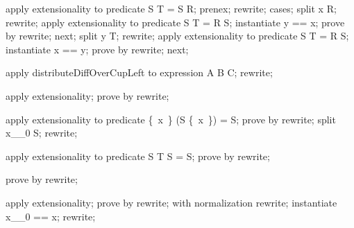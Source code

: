 \begin{LPScript}\begin{forget}[lCapEquivWeakensDiffEquiv]
apply extensionality to predicate S \setminus [X] T = S \setminus [X] R;
prenex;
rewrite;
cases;
split x \in  R;
rewrite;
apply extensionality to predicate S \cap [X] T = R \cap [X] S;
instantiate y == x;
prove by rewrite;
next;
split y \in  T;
rewrite;
apply extensionality to predicate S \cap [X] T = R \cap [X] S;
instantiate x == y;
prove by rewrite;
next;
\end{forget}\end{LPScript}

\begin{LPScript}\begin{forget}[lDistDiffOverUnionLeftBackwards]
apply distributeDiffOverCupLeft to expression A \cup [X] B \setminus [X] C;
rewrite;
\end{forget}\end{LPScript}

\begin{LPScript}\begin{forget}[lElemDiffAbsorbption]
apply extensionality;
prove by rewrite;
\end{forget}\end{LPScript}

\begin{LPScript}\begin{forget}[lElemUnionAbsorbDiffRight]
apply extensionality to predicate \{~x~\} \cup [X] (S \setminus [X] \{~x~\}) = S;
prove by rewrite;
split x\_\_0 \in  S;
rewrite;
\end{forget}\end{LPScript}

\begin{LPScript}\begin{forget}[lUnionAbsorbInter]
apply extensionality to predicate S \cup [X] T \cap [X] S = S;
prove by rewrite;
\end{forget}\end{LPScript}

\begin{LPScript}\begin{forget}[lCupAssociatesBackwards]
prove by rewrite;
\end{forget}\end{LPScript}

\begin{LPScript}\begin{forget}[lUnionExchangeDiffLeft]
apply extensionality;
prove by rewrite;
with normalization rewrite;
instantiate x\_\_0 == x;
rewrite;
\end{forget}\end{LPScript}

